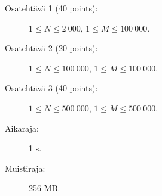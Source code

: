 \documentclass{boi2014-fi}
\begin{document}
    \Scoring

    \begin{description}
        \item[Osatehtävä 1 (40 points):] $1 \le N \le 2\ 000$, $1 \le M \le 100\ 000$.
        \item[Osatehtävä 2 (20 points):] $1 \le N \le 100\ 000$, $1 \le M \le 100\ 000$.
        \item[Osatehtävä 3 (40 points):] $1 \le N \le 500\ 000$, $1 \le M \le 500\ 000$.
    \end{description}

    \Constraints

    \begin{description}
        \item[Aikaraja:] 1 s.
        \item[Muistiraja:] 256 MB.
    \end{description}
\end{document}
